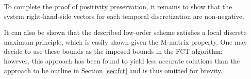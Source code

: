 To complete the proof of positivity preservation, it remains to show that
the system right-hand-side vectors for each temporal discretization are
non-negative.


It can also be shown that the described low-order scheme satisfies a local
discrete maximum principle, which is easily shown given the M-matrix property.
One may decide to use these bounds as the imposed bounds in the FCT
algorithm; however, this approach has been found to yield less accurate solutions
than the approach to be outline in Section \ref{sec:fct} and is thus omitted
for brevity.
